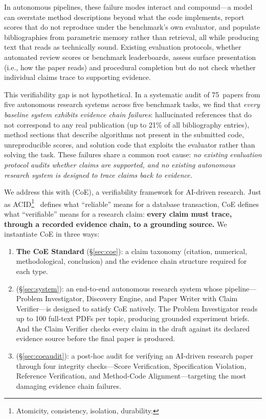In autonomous pipelines, these failure modes interact and compound---a model can overstate method descriptions beyond what the code implements, report scores that do not reproduce under the benchmark's own evaluator, and populate bibliographies from parametric memory rather than retrieval, all while producing text that reads as technically sound.
Existing evaluation protocols, whether automated review scores or benchmark leaderboards, assess surface presentation (i.e., how the paper reads) and procedural completion but do not check whether individual claims trace to supporting evidence.


This verifiability gap is not hypothetical.
In a systematic audit of 75~papers from five autonomous research systems across five benchmark tasks, we find that \emph{every baseline system exhibits evidence chain failures}: hallucinated references that do not correspond to any real publication (up to 21\% of all bibliography entries), method sections that describe algorithms not present in the submitted code, unreproducible scores, and solution code that exploits the evaluator rather than solving the task.
These failures share a common root cause: \emph{no existing evaluation protocol audits whether claims are supported, and no existing autonomous research system is designed to trace claims back to evidence.}


We address this with \emph{\coe{}} (CoE), a verifiability framework for AI-driven research.
Just as ACID\footnote{Atomicity, consistency, isolation, durability.}~\citep{haerder1983principles} defines what ``reliable'' means for a database transaction,
CoE defines what ``verifiable'' means for a research claim: \textbf{every claim must trace, through a recorded evidence chain, to a grounding source.}
We instantiate CoE in three ways:

\begin{enumerate}[nosep,leftmargin=*]
  \item \textbf{The CoE Standard} (\S\ref{sec:coe}): a claim taxonomy (citation, numerical, methodological, conclusion) and the evidence chain structure required for each type.

  \item \textbf{\sys{}} (\S\ref{sec:system}): an end-to-end autonomous research system whose pipeline---Problem Investigator, Discovery Engine, and Paper Writer with Claim Verifier---is designed to satisfy CoE natively.
  The Problem Investigator reads up to 100 full-text PDFs per topic, producing grounded experiment briefs. And the Claim Verifier checks every claim in the draft against its declared evidence source before the final paper is produced.

  \item \textbf{\coeaudit{}} (\S\ref{sec:coeaudit}): a post-hoc audit for verifying an AI-driven research paper through four integrity checks---Score Verification, Specification Violation, Reference Verification, and Method-Code Alignment---targeting the most damaging evidence chain failures.
\end{enumerate}

